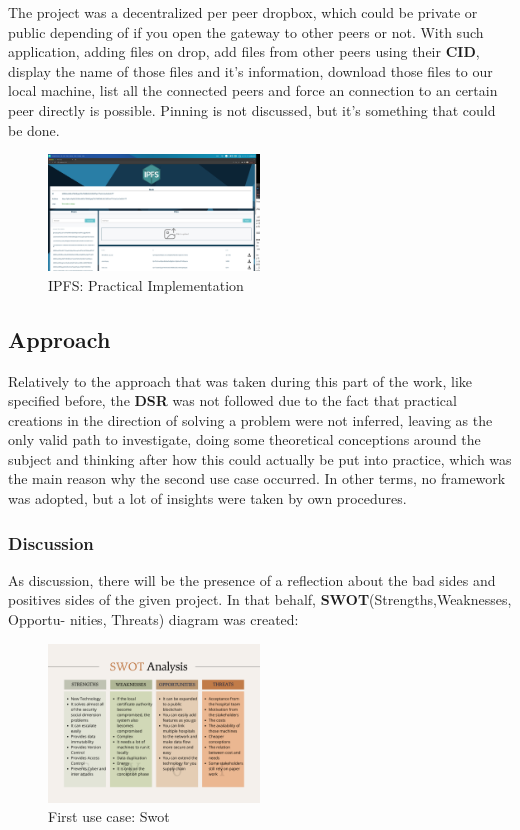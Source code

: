 The project was a decentralized per peer dropbox, which could be private or public depending of if you open the gateway to other peers or not. With such application, adding files on drop, add files from other peers using their \textbf{CID}, display the name of those files and it's information, download those files to our local machine, list all the connected peers and force an connection to an certain peer directly is possible. Pinning is not discussed, but it's something that could be done.

\begin{figure}[H]
    \centering
    \includegraphics[width=0.5\textwidth]{assets/use-case-1/ipfshow.png} %
    \caption{IPFS: Practical Implementation}
    \label{fig:sample-image} 
\end{figure}

\subsection{Approach}
Relatively to the approach that was taken during this part of the work, like specified before, the \textbf{DSR} was not followed due 
to the fact that practical creations in the direction of solving a problem were not inferred, leaving as the only valid path to investigate, 
doing some theoretical conceptions around the subject and thinking after how this could actually be put into practice, which was the main 
reason why the second use case occurred. In other terms, no framework was adopted, but a lot of insights were taken by own procedures.

\subsubsection{Discussion}
As discussion, there will be the presence of a  reflection about the bad sides and positives sides of the given project. In that behalf, \textbf{SWOT}(Strengths,Weaknesses, Opportu-
nities, Threats) diagram was created:

\begin{figure}[H]
    \centering
    \includegraphics[width=0.5\textwidth]{assets/use-case-1/swot.png} %
    \caption{First use case: Swot}
    \label{fig:sample-image} 
\end{figure}

